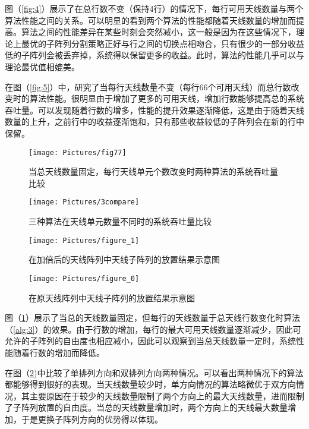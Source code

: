 图（\ref{fig:4}）展示了在总行数不变（保持4行）的情况下，每行可用天线数量与两个算法性能之间的关系。可以明显的看到两个算法的性能都随着天线数量的增加而提高。算法之间的性能差异在某些时刻会突然减小，这一般是因为在这些情况下，理论上最优的子阵列分割策略正好与行之间的切换点相吻合，只有很少的一部分收益低的子阵列会被丢弃掉，系统得以保留更多的收益。此时，算法的性能几乎可以与理论最优值相媲美。

在图（\ref{fig:5}）中，研究了当每行天线数量不变（每行66个可用天线）而总行数改变时的算法性能。很明显由于增加了更多的可用天线，增加行数能够提高总的系统吞吐量。可以发现随着行数的增多，性能的提升效果逐渐降低，这是由于随着天线数量的上升，之前行中的收益逐渐饱和，只有那些收益较低的子阵列会在新的行中保留。

\begin{figure}[htbp]
\centering
\texttt{[image: Pictures/fig77]}
\caption{当总天线数量固定，每行天线单元个数改变时两种算法的系统吞吐量比较}
\label{fig:3}
\end{figure}

\begin{figure}[htbp]
\centering
\texttt{[image: Pictures/3compare]}
\caption{三种算法在天线单元数量不同时的系统吞吐量比较}
\label{fig:6}
\end{figure}


\begin{figure}[htbp]
\texttt{[image: Pictures/figure\_1]}
\centering
\caption{在加倍后的天线阵列中天线子阵列的放置结果示意图}
\label{fig:311}
\end{figure}

\begin{figure}[htbp]
\centering
\texttt{[image: Pictures/figure\_0]}
\caption{在原天线阵列中天线子阵列的放置结果示意图}
\label{fig:312}
\end{figure}

图（\ref{fig:3}）展示了当总的天线数量固定，但每行的天线数量于总天线行数变化时算法（\ref{alg:3}）的效果。由于行数的增加，每行的最大可用天线数量逐渐减少，因此可允许的子阵列的自由度也相应减小，因此可以观察到当总天线数量一定时，系统性能随着行数的增加而降低。

在图（\ref{fig:6})中比较了单排列方向和双排列方向两种情况。可以看出两种情况下的算法都能够得到很好的表现。当天线数量较少时，单方向情况的算法略微优于双方向情况，其主要原因在于较少的天线数量限制了两个方向上的最大天线数量，进而限制了子阵列放置的自由度。当总的天线数量增加时，两个方向上的天线最大数量增加，于是更换子阵列方向的优势得以体现。

